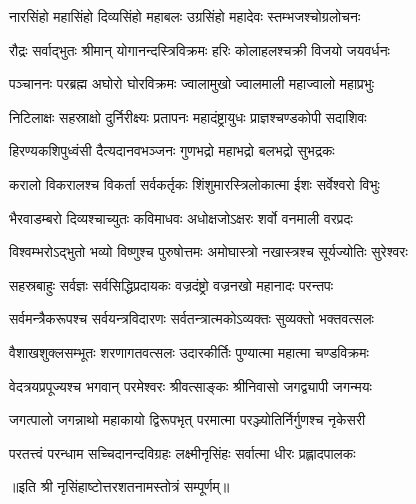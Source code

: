 

\twolineshloka
{नारसिंहो महासिंहो दिव्यसिंहो महाबलः}
{उग्रसिंहो महादेवः स्तम्भजश्चोग्रलोचनः}

\twolineshloka
{रौद्रः सर्वाद्भुतः श्रीमान् योगानन्दस्त्रिविक्रमः}
{हरिः कोलाहलश्चक्री विजयो जयवर्धनः}

\twolineshloka
{पञ्चाननः परब्रह्म अघोरो घोरविक्रमः}
{ज्वालामुखो ज्वालमाली महाज्वालो महाप्रभुः}

\twolineshloka
{निटिलाक्षः सहस्राक्षो दुर्निरीक्ष्यः प्रतापनः}
{महादंष्ट्रायुधः  प्राज्ञश्चण्डकोपी सदाशिवः}

\twolineshloka
{हिरण्यकशिपुध्वंसी दैत्यदानवभञ्जनः}
{गुणभद्रो महाभद्रो बलभद्रो सुभद्रकः}

\twolineshloka
{करालो विकरालश्च विकर्ता सर्वकर्तृकः}
{शिंशुमारस्त्रिलोकात्मा ईशः सर्वेश्वरो विभुः}

\twolineshloka
{भैरवाडम्बरो दिव्यश्चाच्युतः कविमाधवः}
{अधोक्षजोऽक्षरः शर्वो वनमाली वरप्रदः}

\twolineshloka
{विश्वम्भरोऽद्भुतो भव्यो विष्णुश्च पुरुषोत्तमः}
{अमोघास्त्रो नखास्त्रश्च सूर्यज्योतिः सुरेश्वरः}

\twolineshloka
{सहस्रबाहुः सर्वज्ञः सर्वसिद्धिप्रदायकः}
{वज्रदंष्ट्रो वज्रनखो महानादः परन्तपः}

\twolineshloka
{सर्वमन्त्रैकरूपश्च सर्वयन्त्रविदारणः}
{सर्वतन्त्रात्मकोऽव्यक्तः सुव्यक्तो भक्तवत्सलः}

\twolineshloka
{वैशाखशुक्लसम्भूतः शरणागतवत्सलः}
{उदारकीर्तिः पुण्यात्मा महात्मा चण्डविक्रमः}

\twolineshloka
{वेदत्रयप्रपूज्यश्च भगवान् परमेश्वरः}
{श्रीवत्साङ्कः श्रीनिवासो जगद्व्यापी  जगन्मयः}

\twolineshloka
{जगत्पालो जगन्नाथो महाकायो द्विरूपभृत्}
{परमात्मा परञ्ज्योतिर्निर्गुणश्च नृकेसरी}

\twolineshloka
{परतत्त्वं परन्धाम सच्चिदानन्दविग्रहः}
{लक्ष्मीनृसिंहः सर्वात्मा धीरः प्रह्लादपालकः}

॥इति श्री नृसिंहाष्टोत्तरशतनामस्तोत्रं सम्पूर्णम्॥
